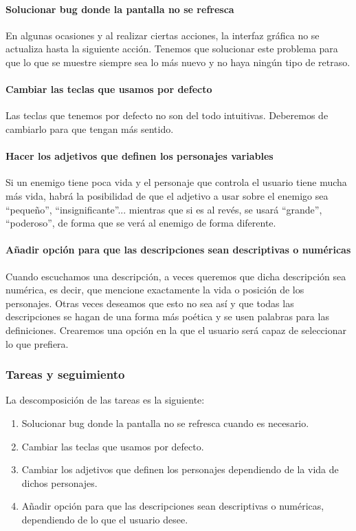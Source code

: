 \paragraph{Solucionar bug donde la pantalla no se refresca} En algunas ocasiones y al realizar ciertas acciones, la interfaz gráfica no se actualiza hasta la siguiente acción. Tenemos que solucionar este problema para que lo que se muestre siempre sea lo más nuevo y no haya ningún tipo de retraso.

\paragraph{Cambiar las teclas que usamos por defecto} Las teclas que tenemos por defecto no son del todo intuitivas. Deberemos de cambiarlo para que tengan más sentido.

\paragraph{Hacer los adjetivos que definen los personajes variables} Si un enemigo tiene poca vida y el personaje que controla el usuario tiene mucha más vida, habrá la posibilidad de que el adjetivo a usar sobre el enemigo sea ``pequeño'', ``insignificante''... mientras que si es al revés, se usará ``grande'', ``poderoso'', de forma que se verá al enemigo de forma diferente.

\paragraph{Añadir opción para que las descripciones sean descriptivas o numéricas} Cuando escuchamos una descripción, a veces queremos que dicha descripción sea numérica, es decir, que mencione exactamente la vida o posición de los personajes. Otras veces deseamos que esto no sea así y que todas las descripciones se hagan de una forma más poética y se usen palabras para las definiciones. Crearemos una opción en la que el usuario será capaz de seleccionar lo que prefiera.

\subsubsection{Tareas y seguimiento}

La descomposición de las tareas es la siguiente:

\begin{enumerate}[label=\bfseries WBS 7.\arabic*]
  \item Solucionar bug donde la pantalla no se refresca cuando es necesario.
  \item Cambiar las teclas que usamos por defecto.
  \item Cambiar los adjetivos que definen los personajes dependiendo de la vida de dichos personajes.
  \item Añadir opción para que las descripciones sean descriptivas o numéricas, dependiendo de lo que el usuario desee.
\end{enumerate}


